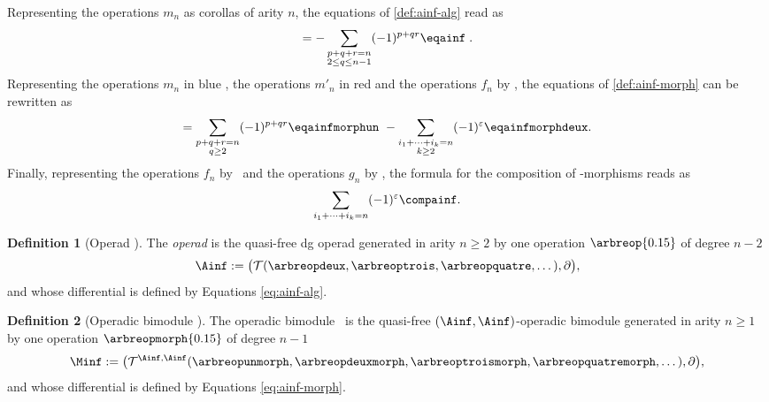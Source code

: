 \documentclass[JEP,XML,SOM,NoFloatCountersInSection,Unicode,published]{cedram}
\theoremstyle{definition}
\newtheorem{definition}{Definition}[section]
\theoremstyle{plain}
\begin{document}
Representing the operations $m_n$ as corollas  of arity $n$, the equations of \cref{def:ainf-alg} read as
\begin{equation}
[\partial, \arbreop{0.15}] = - \sum_{\substack{p+q+r=n \\ 2 \leq q \leq n-1}} (-1)^{p+qr} \eqainf\;. \label{eq:ainf-alg}
\end{equation}
Representing the operations $m_n$ in blue , the operations $m'_n$ in red  and the operations $f_n$ by , the equations of \cref{def:ainf-morph} can be rewritten as
\begin{align}
[\partial, \arbreopmorph{0.15}] = \sum_{\substack{p+q+r=n \\ q \geq 2}} (-1)^{p+qr} \eqainfmorphun \ - \sum_{\substack{i_1+\cdots+i_k=n \\ k \geq 2}} (-1)^{\varepsilon} \eqainfmorphdeux. \label{eq:ainf-morph}
\end{align}
Finally, representing the operations $f_n$ by \arbreopmorphcompun\ and the operations $g_n$ by \arbreopmorphcompdeux, the formula for the composition of \Ainf -morphisms reads as
\begin{align}
\sum_{i_1+\cdots+i_k=n} (-1)^{\varepsilon} \compainf. \label{eq:ainf-comp}
\end{align}

 \label{sss:operad-ainf-operadic-bimod-minf}

\begin{definition}[Operad \Ainf]
The \emph{operad \Ainf} is the quasi-free dg operad generated in arity $n \geq 2$ by one operation $\arbreop{0.15}$ of degree $n-2$
\[
\Ainf := \bigl(\mathcal{T}(\arbreopdeux, \arbreoptrois, \arbreopquatre, \dots), \partial \bigr),
\]
and whose differential is defined by Equations \eqref{eq:ainf-alg}.
\end{definition}

\begin{definition}[Operadic bimodule \Minf]
The operadic bimodule \Minf\ is the quasi-free $(\Ainf,\Ainf)$-operadic bimodule generated in arity $n \geq 1$ by one operation $\arbreopmorph{0.15}$ of degree $n-1$
\[
\Minf := \bigl(\mathcal{T}^{\Ainf, \Ainf}(\arbreopunmorph, \arbreopdeuxmorph, \arbreoptroismorph, \arbreopquatremorph, \dots), \partial \bigr),
\]
and whose differential is defined by Equations \eqref{eq:ainf-morph}.
\end{definition}
\end{document}
